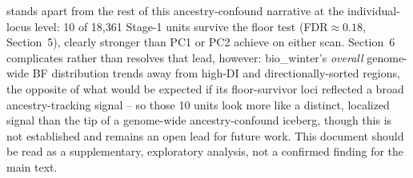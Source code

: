 \documentclass[11pt]{article}
\begin{document}
stands apart from the rest of this ancestry-confound narrative at the individual-locus level:
10 of 18{,}361 Stage-1 units survive the floor test (FDR$\approx0.18$, Section~5), clearly
stronger than PC1 or PC2 achieve on either scan. Section~6 complicates rather than resolves
that lead, however: bio\_winter's \emph{overall} genome-wide BF distribution trends away from
high-DI and directionally-sorted regions, the opposite of what would be expected if its
floor-survivor loci reflected a broad ancestry-tracking signal -- so those 10 units look more
like a distinct, localized signal than the tip of a genome-wide ancestry-confound iceberg,
though this is not established and remains an open lead for future work. This document should
be read as a supplementary, exploratory analysis, not a confirmed finding for the main text.
\end{document}
